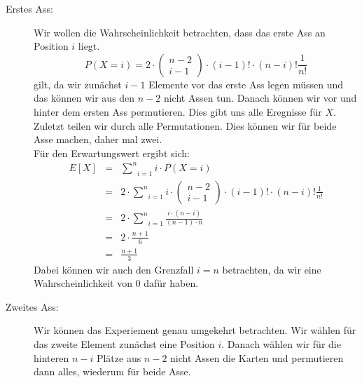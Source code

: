 \documentclass[11pt,a4paper,ngerman]{article}
\begin{document}
\begin{description}
    \item[Erstes Ass:] Wir wollen die Wahrscheinlichkeit betrachten, dass das erste Ass an Position $i$ liegt.
        \[
            P(X=i) = 2 \cdot \begin{pmatrix} n - 2 \\ i - 1\end{pmatrix} \cdot (i-1)! \cdot (n-i)! \frac{1}{n!}
        \]
        gilt, da wir zunächst $i-1$ Elemente vor das erste Ass legen müssen und das können wir aus den $n-2$ nicht Assen tun.
        Danach können wir vor und hinter dem ersten Ass permutieren. Dies gibt uns alle Eregnisse für $X$. Zuletzt teilen wir
        durch alle Permutationen. Dies können wir für beide Asse machen, daher mal zwei.\\

        Für den Erwartungswert ergibt sich:
        \[\begin{array}{rcl}
            E[X] &=& \underset{i=1}{\overset{n}{\sum}} i \cdot P(X=i)\\
                &=& 2\cdot\underset{i=1}{\overset{n}{\sum}} i \cdot \begin{pmatrix} n - 2 \\ i - 1\end{pmatrix} \cdot (i-1)! \cdot (n-i)! \frac{1}{n!}\\
                &=& 2\cdot\underset{i=1}{\overset{n}{\sum}} \frac{i\cdot (n-i)}{(n-1)\cdot n}\\
                &=& 2\cdot \frac{n+1}{6}\\
                &=& \frac{n+1}{3}
        \end{array}\]
        Dabei können wir auch den Grenzfall $i=n$ betrachten, da wir eine Wahrscheinlichkeit von $0$ dafür haben.
    \item[Zweites Ass:]
        Wir können das Experiement genau umgekehrt betrachten. Wir wählen für das zweite Element zunächst eine Position $i$. Danach wählen wir
        für die hinteren $n-i$ Plätze aus $n-2$ nicht Assen die Karten und permutieren dann alles, wiederum für beide Asse.


\end{description}
\end{document}
